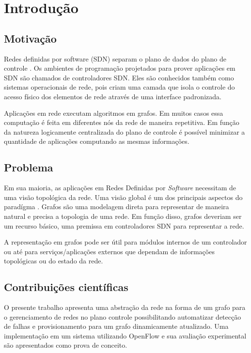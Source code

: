 \chapter{Introdução}
\label{chap:introduction}


\section{Motivação}

Redes definidas por software (SDN) separam o plano de dados do plano 
de controle \citep{guedes2012redes}.
Os ambientes de programação projetados para prover aplicações em SDN são 
chamados de controladores SDN.
Eles são conhecidos também como sistemas operacionais de rede, pois criam uma
camada que isola o controle do acesso físico dos elementos de rede através 
de uma interface padronizada.

Aplicações em rede executam algoritmos em grafos.
Em muitos casos essa computação é feita em diferentes nós da rede de maneira 
repetitiva.
Em função da natureza logicamente centralizada do plano de controle é possível
minimizar a quantidade de aplicações computando as mesmas informações.

\section{Problema}

Em sua maioria, as aplicações em Redes Definidas por \emph{Software} necessitam
de uma visão topológica da rede.
Uma visão global é um dos principais aspectos do paradígma 
\citep{martin2010virtualizing}.
Grafos são uma modelagem direta para representar de maneira natural e precisa 
a topologia de uma rede.
Em função disso, grafos deveriam ser um recurso básico, uma premissa em 
controladores SDN para representar a rede.

A representação em grafos pode ser útil para módulos internos de um controlador
ou até para serviços/aplicações externos que dependam de informações 
topológicas ou do estado da rede.

\section{Contribuições científicas}

O presente trabalho apresenta uma abstração da rede na forma de um grafo 
para o gerenciamento de redes no plano controle possibilitando automatizar 
detecção de falhas e provisionamento para um grafo dinamicamente atualizado.
Uma implementação em um sistema utilizando OpenFlow \citep{nick2008openflow}
e sua avaliação experimental são apresentados como prova de conceito.

